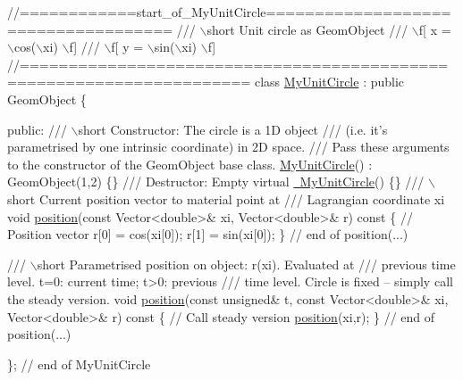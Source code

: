  
\begin{DoxyCodeInclude}
\textcolor{comment}{//============start\_of\_MyUnitCircle====================================}
\textcolor{comment}{/// \(\backslash\)short Unit circle as GeomObject}
\textcolor{comment}{}\textcolor{comment}{/// \(\backslash\)f[ x = \(\backslash\)cos(\(\backslash\)xi)  \(\backslash\)f]}
\textcolor{comment}{}\textcolor{comment}{/// \(\backslash\)f[ y = \(\backslash\)sin(\(\backslash\)xi)  \(\backslash\)f]}
\textcolor{comment}{}\textcolor{comment}{//=====================================================================}
\textcolor{keyword}{class }\hyperlink{classMyUnitCircle}{MyUnitCircle} : \textcolor{keyword}{public} GeomObject
\{

\textcolor{keyword}{public}:
\textcolor{comment}{}
\textcolor{comment}{ /// \(\backslash\)short Constructor: The circle is a 1D object}
\textcolor{comment}{ /// (i.e. it's parametrised by one intrinsic coordinate) in 2D space.}
\textcolor{comment}{ /// Pass these arguments to the constructor of the GeomObject base class.}
\textcolor{comment}{} \hyperlink{classMyUnitCircle_a056add64776e52a8ea2ba2e9d6d0e32d}{MyUnitCircle}() : GeomObject(1,2) \{\}
\textcolor{comment}{}
\textcolor{comment}{ /// Destructor: Empty}
\textcolor{comment}{} \textcolor{keyword}{virtual} \hyperlink{classMyUnitCircle_ae6b321a25ef6f6b12d7c9a225f91140d}{~MyUnitCircle}() \{\}
\textcolor{comment}{}
\textcolor{comment}{ /// \(\backslash\)short Current position vector to material point at }
\textcolor{comment}{ /// Lagrangian coordinate xi }
\textcolor{comment}{} \textcolor{keywordtype}{void} \hyperlink{classMyUnitCircle_ab60b73d1c28b013c40dd2aaa98072261}{position}(\textcolor{keyword}{const} Vector<double>& xi, Vector<double>& r)\textcolor{keyword}{ const}
\textcolor{keyword}{  }\{
   \textcolor{comment}{// Position vector}
   r[0] = cos(xi[0]);
   r[1] = sin(xi[0]);
  \} \textcolor{comment}{// end of position(...)}

\textcolor{comment}{}
\textcolor{comment}{ /// \(\backslash\)short Parametrised position on object: r(xi). Evaluated at}
\textcolor{comment}{ /// previous time level. t=0: current time; t>0: previous}
\textcolor{comment}{ /// time level. Circle is fixed -- simply call the steady version.}
\textcolor{comment}{} \textcolor{keywordtype}{void} \hyperlink{classMyUnitCircle_ab60b73d1c28b013c40dd2aaa98072261}{position}(\textcolor{keyword}{const} \textcolor{keywordtype}{unsigned}& t, \textcolor{keyword}{const} Vector<double>& xi,
               Vector<double>& r)\textcolor{keyword}{ const}
\textcolor{keyword}{  }\{
   \textcolor{comment}{// Call steady version }
   \hyperlink{classMyUnitCircle_ab60b73d1c28b013c40dd2aaa98072261}{position}(xi,r);
  \} \textcolor{comment}{// end of position(...)}


\}; \textcolor{comment}{// end of MyUnitCircle}

\end{DoxyCodeInclude}




